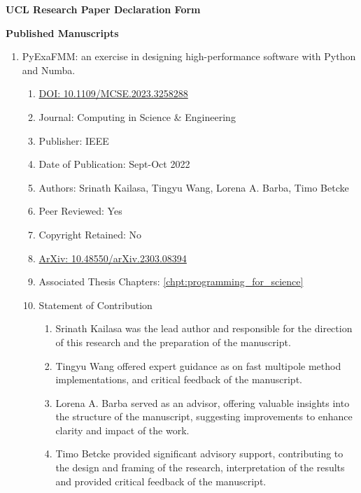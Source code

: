 \thispagestyle{plain}

\begin{center}
    \textbf{UCL Research Paper Declaration Form}
\end{center}

\textbf{Published Manuscripts}

\begin{enumerate}
    \item PyExaFMM: an exercise in designing high-performance software with Python and Numba.
    \begin{enumerate}[label=\alph*)]
      \item \href{https://ieeexplore.ieee.org/document/10124108}{DOI: 10.1109/MCSE.2023.3258288}
      \item Journal: Computing in Science \& Engineering
      \item Publisher: IEEE
      \item Date of Publication: Sept-Oct 2022
      \item Authors: Srinath Kailasa, Tingyu Wang, Lorena A. Barba, Timo Betcke
      \item Peer Reviewed: Yes
      \item Copyright Retained: No
      \item \href{https://doi.org/10.48550/arXiv.2303.08394}{ArXiv: 10.48550/arXiv.2303.08394}
      \item Associated Thesis Chapters: \ref{chpt:programming_for_science}
      \item Statement of Contribution
      \begin{enumerate}
        \item Srinath Kailasa was the lead author and responsible for the direction of this research and the preparation of the manuscript.
        \item Tingyu Wang offered expert guidance as on fast multipole method implementations, and critical feedback of the manuscript.
        \item Lorena A. Barba served as an advisor, offering valuable insights into the structure of the manuscript, suggesting improvements to enhance clarity and impact of the work.
        \item Timo Betcke provided significant advisory support, contributing to the design and framing of the research, interpretation of the results and provided critical feedback of the manuscript.
      \end{enumerate}
    \end{enumerate}
\end{enumerate}

